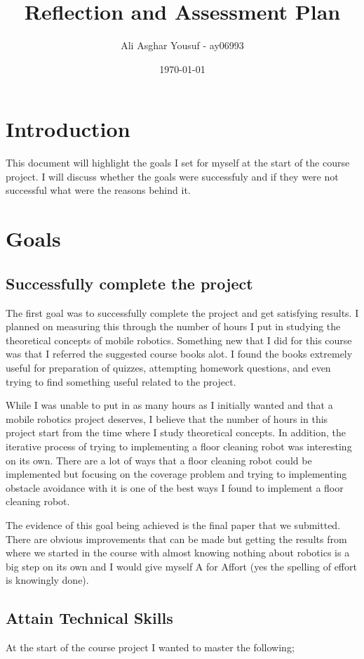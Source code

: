 \documentclass[12pt]{article}
\title{Reflection and Assessment Plan}
\author{Ali Asghar Yousuf - ay06993}
\date{\today}
\begin{document}
\maketitle

\section*{Introduction}
This document will highlight the goals I set for myself at the start of the course project. I will discuss whether the goals were successfuly and if they were not successful what were the reasons behind it.

\section*{Goals}
\subsection*{Successfully complete the project}
The first goal was to successfully complete the project and get satisfying
results. I planned on measuring this through the number of hours I put in
studying the theoretical concepts of mobile robotics. Something new that I did
for this course was that I referred the suggested course books alot. I found
the books extremely useful for preparation of quizzes, attempting homework
questions, and even trying to find something useful related to the project.

While I was unable to put in as many hours as I initially wanted and that a
mobile robotics project deserves, I believe that the number of hours in this
project start from the time where I study theoretical concepts. In addition,
the iterative process of trying to implementing a floor cleaning robot was
interesting on its own. There are a lot of ways that a floor cleaning robot
could be implemented but focusing on the coverage problem and trying to
implementing obstacle avoidance with it is one of the best ways I found to
implement a floor cleaning robot.

The evidence of this goal being achieved is the final paper that we submitted.
There are obvious improvements that can be made but getting the results from
where we started in the course with almost knowing nothing about robotics is a
big step on its own and I would give myself A for Affort (yes the spelling of
effort is knowingly done).

\subsection*{Attain Technical Skills}
At the start of the course project I wanted to master the following;
\end{document}

